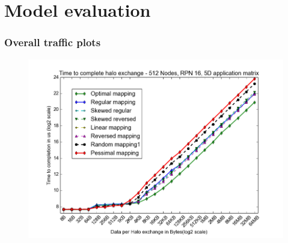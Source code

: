 \documentclass{beamer}
\begin{document}
\section{Model evaluation}

\begin{frame}
\frametitle{Overall traffic plots}
\begin{figure}
\includegraphics[width=0.8\linewidth]{../3D_512_all_mappings.png}
\end{figure}
\end{frame}
\end{document}
